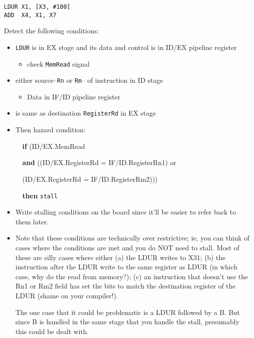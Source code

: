 \begin{frame}[fragile]
\begin{verbatim}
LDUR X1, [X3, #100]
ADD  X4, X1, X7       
\end{verbatim}
Detect the following conditions:
\begin{itemize}
\item {\tt LDUR} is in EX stage and its data and control is in ID/EX pipeline register
\begin{itemize}
    \item  check {\tt MemRead} signal
\end{itemize}
\item either source--{\tt Rn} or {\tt Rm}-- of instruction in ID stage 
\begin{itemize}
 \item Data in IF/ID pipeline register
\end{itemize}
\item is same as destination {\tt RegisterRd} in EX stage
\item Then hazard condition:

~~\textbf{if} ({\color{red}ID/EX.MemRead} 

~~\textbf{and} (({\color{blue}ID/EX.RegisterRd = IF/ID.RegisterRn1}) or

~~\qquad ({\color{orange}ID/EX.RegisterRd = IF/ID.RegisterRm2})))

~~\textbf{then} {\tt stall}

\end{itemize}
\BNotes\ifnum{}
\begin{itemize}
\item Write stalling conditions on the board since it'll be easier
	to refer back to them later.
\item Note that these conditions are technically over restrictive;
	ie, you can think of cases where the conditions are met and
	you do NOT need to stall.  Most of these are silly cases where
	either (a) the LDUR writes to X31; (b) the instruction after the
	LDUR write to the same register as LDUR (in which case, why do the
	read from memory?); (c) an instruction  that doesn't
	use the Rn1 or Rm2 field has set the bits to match the destination 
	register of the LDUR (shame on your compiler!).

	The one case that it could be problematic is a LDUR followed by
	a B.  But since B is handled in the same stage that you
	handle the stall, presumably this could be dealt with.
\end{itemize}
\fi\ENotes
\end{frame}

